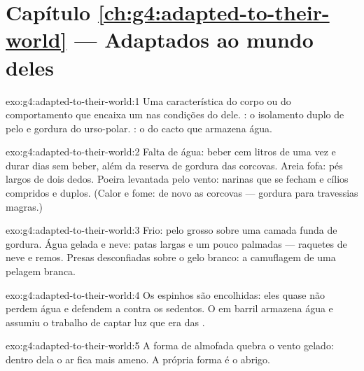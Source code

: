 \section*{Capítulo \ref{ch:g4:adapted-to-their-world} --- Adaptados ao mundo deles}

\begin{solution}{exo:g4:adapted-to-their-world:1}
Uma característica do corpo ou do comportamento que encaixa um  nas condições do  dele. : o isolamento duplo de
pelo e gordura do urso-polar. : o  do cacto que armazena
água.
\end{solution}

\begin{solution}{exo:g4:adapted-to-their-world:2}
Falta de água: beber cem litros de uma vez e durar dias sem beber,
além da reserva de gordura das corcovas. Areia fofa: pés largos de
dois dedos. Poeira levantada pelo vento: narinas que se fecham e
cílios compridos e duplos. (Calor e fome: de novo as corcovas ---
gordura para travessias magras.)
\end{solution}

\begin{solution}{exo:g4:adapted-to-their-world:3}
Frio: pelo grosso sobre uma camada funda de gordura. Água gelada e
neve: patas largas e um pouco palmadas --- raquetes de neve e remos.
Presas desconfiadas sobre o gelo branco: a camuflagem de uma pelagem
branca.
\end{solution}

\begin{solution}{exo:g4:adapted-to-their-world:4}
Os espinhos são  encolhidas: eles quase não perdem água e
defendem a  contra os  sedentos. O  em barril
armazena água e assumiu o trabalho de captar luz que era das .
\end{solution}

\begin{solution}{exo:g4:adapted-to-their-world:5}
A forma de almofada quebra o vento gelado: dentro dela o ar fica mais
ameno. A própria forma é o abrigo.
\end{solution}

